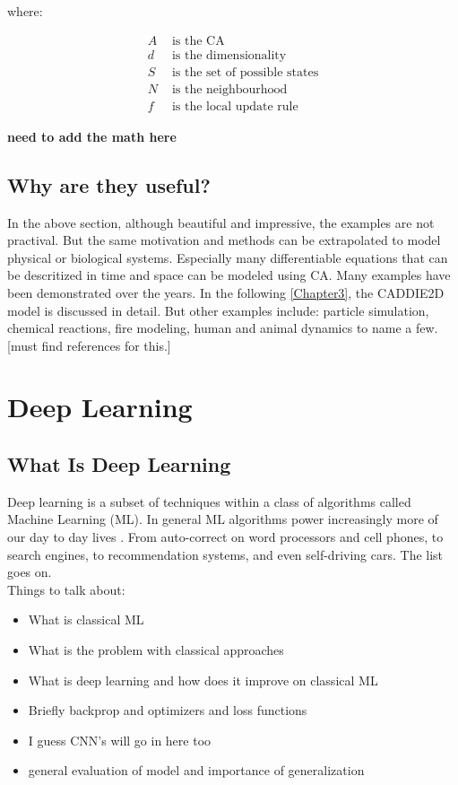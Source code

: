where:

\begin{align*}
	A &  \text{ is the CA} \\
	d &  \text{ is the dimensionality} \\
	S &  \text{ is the set of possible states} \\
	N &  \text{ is the neighbourhood} \\
	f &  \text{ is the local update rule}
\end{align*}

\textbf{need to add the math here}
\subsection{Why are they useful?}
In the above section, although beautiful and impressive, the examples are not practival. But the same motivation and methods can be extrapolated to model physical or biological systems. Especially many differentiable equations that can be descritized in time and space can be modeled using CA. Many examples have been demonstrated over the years. In the following \ref{Chapter3}, the CADDIE2D model is discussed in detail. But other examples include: particle simulation, chemical reactions, fire modeling, human and animal dynamics to name a few. [must find references for this.]

\section{Deep Learning}
\subsection{What Is Deep Learning}

Deep learning is a subset of techniques within a class of algorithms called Machine Learning (ML). In general ML algorithms power increasingly more of our day to day lives \cite{lecun2015deep}. From auto-correct on word processors and cell phones, to search engines, to recommendation systems, and even self-driving cars. The list goes on. \\

Things to talk about:
\begin{itemize}
	\item What is classical ML
	\item What is the problem with classical approaches
	\item What is deep learning and how does it improve on classical ML
	\item Briefly backprop and optimizers and loss functions
	\item I guess CNN's will go in here too
	\item general evaluation of model and importance of generalization
\end{itemize}
